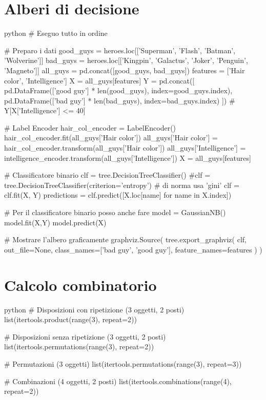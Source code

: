 \documentclass[11pt]{report}
\begin{document}
\section{Alberi di decisione}
\begin{mintedbox}{python}
# Eseguo tutto in ordine

# Preparo i dati
good_guys = heroes.loc[['Superman', 'Flash', 'Batman', 'Wolverine']]
bad_guys = heroes.loc[['Kingpin', 'Galactus', 'Joker', 'Penguin', 'Magneto']]
all_guys = pd.concat([good_guys, bad_guys])
features = ['Hair color', 'Intelligence']
X = all_guys[features]
Y = pd.concat([
    pd.DataFrame(['good guy'] * len(good_guys), index=good_guys.index),
    pd.DataFrame(['bad guy'] * len(bad_guys), index=bad_guys.index)
])
# Y[X['Intelligence'] <= 40]

# Label Encoder
hair_col_encoder = LabelEncoder()
hair_col_encoder.fit(all_guys['Hair color'])
all_guys['Hair color'] = hair_col_encoder.transform(all_guys['Hair color'])
all_guys['Intelligence'] = intelligence_encoder.transform(all_guys['Intelligence'])
X = all_guys[features]

# Classificatore binario
clf = tree.DecisionTreeClassifier()
#clf = tree.DecisionTreeClassifier(criterion='entropy')     # di norma usa 'gini'
clf = clf.fit(X, Y)
predictions = clf.predict([X.loc[name] for name in X.index])

# Per il classificatore binario posso anche fare
model = GaussianNB()
model.fit(X,Y)
model.predict(X)

# Mostrare l'albero graficamente
graphviz.Source(
    tree.export_graphviz(
        clf,
        out_file=None, 
        class_names=['bad guy', 'good guy'],
        feature_names=features
    )
)
\end{mintedbox}

\section{Calcolo combinatorio}
\begin{mintedbox}{python}
# Disposizioni con ripetizione (3 oggetti, 2 posti)
list(itertools.product(range(3), repeat=2))

# Disposizioni senza ripetizione (3 oggetti, 2 posti)
list(itertools.permutations(range(3), repeat=2))

# Permutazioni (3 oggetti)
list(itertools.permutations(range(3), repeat=3))

# Combinazioni (4 oggetti, 2 posti)
list(itertools.combinations(range(4), repeat=2))
\end{mintedbox}
\end{document}
